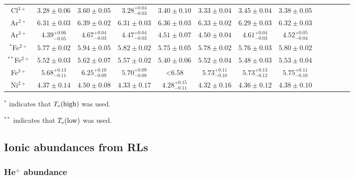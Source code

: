 \documentclass[fleqn,usenatbib]{mnras}
\begin{document}
\begin{table*}
\begin{adjustbox}{width=\textwidth}
\begin{tabular}{ccccccccccccc}
Cl$^{3+}$ & $3.28 \pm 0.06$ & $3.60 \pm 0.05$  & $3.28^{+0.04} _{-0.03}$  & $3.40 \pm 0.10 $ & $3.33 \pm 0.04$ & $3.45 \pm 0.04$ & $3.38 \pm 0.05$ \\

Ar$^{2+}$ & $6.31 \pm 0.03$ & $6.39 \pm 0.02$ & $6.31 \pm 0.03$ &  $6.36 \pm 0.03 $  & $6.33 \pm 0.02$ & $6.29 \pm 0.03$ & $6.32 \pm 0.03$  \\

Ar$^{3+}$ & $4.39^{+0.06} _{-0.05}$ & $4.67^{+0.04} _{-0.03}$ & $4.47^{+0.04} _{-0.03}$ &  $4.51 \pm 0.07 $  & $4.50 \pm 0.04$ & $4.61^{+0.04} _{-0.03}$ & $4.52^{+0.05} _{-0.04}$  \\

$^{*}$Fe$^{2+}$ & $5.77\pm 0.02$ & $5.94 \pm 0.05$ & $5.82\pm 0.02$ &  $5.75 \pm 0.05$  & $5.78 \pm 0.02$ & $5.76 \pm 0.03$ & $5.80 \pm 0.02$\\

$^{**}$Fe$^{2+}$ &$5.52\pm 0.03$ &$5.62 \pm 0.07$ & $5.57\pm 0.02$ & $5.40 \pm 0.06$  &$5.52 \pm 0.04$ & $5.48 \pm 0.03$ & $5.53 \pm 0.04$ \\

Fe$^{3+}$ & $5.68^{+0.13} _{-0.11}$ & $6.25^{+0.10} _{-0.09}$  & $5.70^{+0.09} _{-0.08}$ & <6.58& $5.73^{+0.11} _{-0.10}$ & $5.73^{+0.13} _{-0.12}$ & $5.75^{+0.11} _{-0.10}$  \\

Ni$^{2+}$ & $4.37 \pm 0.14$ & $4.50\pm 0.08$ & $4.33 \pm 0.17$ & $4.28^{+0.15} _{-0.11}$    & $4.32 \pm 0.16$& $4.36 \pm 0.12$& $4.38 \pm 0.10$\\

\hline
\end{tabular}
\end{adjustbox}
\begin{description}
\item $^*$ indicates that $T_{\rm e} (\text{high})$ was used. \\
\item $^{**}$ indicates that $T_{\rm e} (\text{low})$ was used. \\
\end{description}
\end{table*}



\subsection{Ionic abundances from RLs}
\label{subsec:ionic_from_RLs}


\subsubsection{He$^{+}$ abundance}
\label{subsubsec:ionic_from_He1r}
\end{document}
